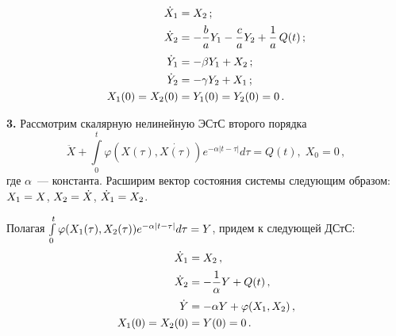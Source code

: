 \begin{multicols}{2}
\columnbreak

\noindent
\begin{align*}
    \dot{X}_1 &= X_2\,;\\
    \dot{X}_2 &= -\displaystyle\frac{\displaystyle b\mathstrut}{\displaystyle a\mathstrut}Y_1 -\displaystyle\frac{\displaystyle c\mathstrut}{\displaystyle a\mathstrut}Y_2+\displaystyle\frac{\displaystyle 1\mathstrut}{\displaystyle a\mathstrut}\,Q(t)\,;\\
    \dot{Y}_1 &=   -\beta Y_1+ X_2\,;\\
    \dot{Y}_2 &=   -\gamma Y_2+ X_1\,;\\
    X_1(0) = X_2(0) &= Y_1(0) = Y_2(0) = 0\,.
\end{align*}


{\bf 3.}
 Рассмотрим скалярную нелинейную ЭСтС второго порядка
    $$
    \ddot{X}+\int\limits_{0}^{t}\varphi(X(\tau),\dot{X(\tau)})
    e^{-\alpha |t-\tau|}d\tau = Q(t), \; X_0 = 0\,,
    $$
где $\alpha$~--- константа. Расширим вектор состояния системы следующим образом:
$X_1 \hm= X$, $X_2 \hm= \dot{X}$, $\dot{X}_1 \hm= X_2$.

Полагая $\int\limits_{0}^{t}\varphi(X_1(\tau),X_2(\tau))e^{-\alpha |t-\tau|}d\tau \hm= Y$, 
придем к следующей ДСтС:
\begin{align*}
    \dot{X}_1 &= X_2\,, \\
    \dot{X}_2 &= - \displaystyle\frac{\displaystyle 1\mathstrut}{\displaystyle \alpha\mathstrut}Y + Q(t)\,,\\
    \dot{Y}   &=  - \alpha Y +  \varphi(X_1,X_2)\,,\\
    X_1(0) = X_2(0) &= Y(0) = 0\,.
\end{align*}


\end{multicols}

